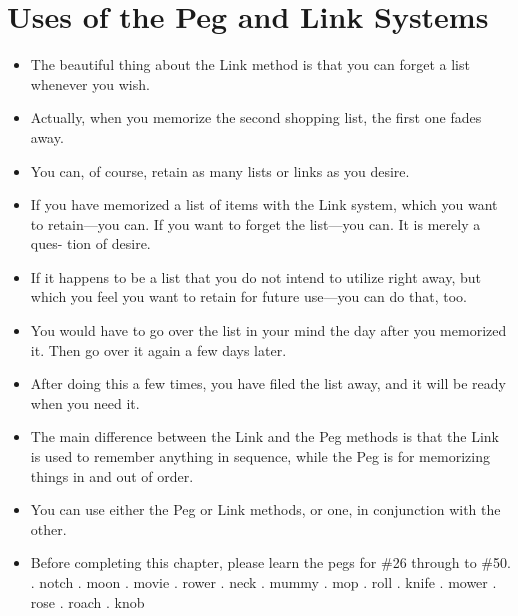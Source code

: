     \section*{Uses of the Peg and Link Systems}
        \begin{itemize}
            \item The beautiful thing about the Link method is that
            you can forget a list whenever you wish.
            \item Actually, when
            you memorize the second shopping list, the first one fades
            away.
            \item You can, of course, retain as many lists or links as
            you desire.
            \item If you have memorized a list of items
            with the Link system, which you want to retain—you can.
            If you want to forget the list—you can. It is merely a ques-
            tion of desire.
            \item If it happens to be a list that
            you do not intend to utilize right away, but which you feel
            you want to retain for future use—you can do that, too.
            \item You would have to go over the list in your mind the day
            after you memorized it. Then go over it again a few days
            later.
            \item After doing this a few times, you have filed the list
            away, and it will be ready when you need it.
            \item The main difference between the Link and the Peg
            methods is that the Link is used to remember anything in
            sequence, while the Peg is for memorizing things in and out
            of order.
            \item You can use
            either the Peg or Link methods, or one, in conjunction with
            the other.
            \item Before completing this chapter, please learn the pegs for
            \#26 through to \#50.
                . notch
                . moon
                . movie
                . rower
                . neck
                . mummy
                . mop
                . roll
                . knife
                . mower
                . rose
                . roach
                . knob

\end{itemize}
